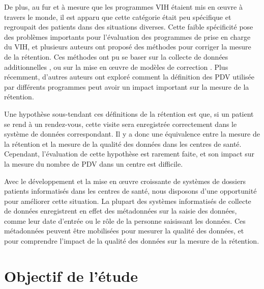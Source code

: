 \documentclass[paper=a4, fontsize=11pt]{scrartcl}
\numberwithin{equation}{section}		%
\numberwithin{figure}{section}			%
\numberwithin{table}{section}				%
\begin{document}
De plus, au fur et à mesure que les programmes VIH étaient mis en \oe uvre à travers le monde, il est apparu que cette catégorie était peu spécifique et regroupait des patients dans des situations diverses\citep{kwong-leung_yu_true_2007,dalal_characteristics_2008,mcguire_vital_2010}. Cette faible spécificité pose des problèmes importants pour l'évaluation des programmes de prise en charge du VIH, et plusieurs auteurs ont proposé des méthodes pour corriger la mesure de la rétention. Ces méthodes ont pu se baser sur la collecte de données additionnelles \citep{yiannoutsos_sampling-based_2008,geng_tracking_2010,tassie_evaluation_2010}, ou sur la mise en \oe uvre de modèles de correction \citep{brinkhof_adjusting_2010,egger_correcting_2011,van_cutsem_correcting_2011,henriques_comparison_2012,verguet_incorporating_2013}. Plus récemment, d'autres auteurs ont exploré comment la définition des PDV utilisée par différents programmes peut avoir un impact important sur la mesure de la rétention\citep{chi_empirical_2010,chi_universal_2011,fox_defining_2012,mugavero_measuring_2012,yehia_comparing_2012,grimsrud_impact_2013,shepherd_impact_2013}.

Une hypothèse sous-tendant ces définitions de la rétention est que, si un patient se rend à un rendez-vous, cette visite sera enregistrée correctement dans le système de données correspondant. Il y a donc une équivalence entre la mesure de la rétention et la mesure de la qualité des données dans les centres de santé. Cependant, l'évaluation de cette hypothèse est rarement faite, et son impact sur la mesure du nombre de PDV dans un centre est difficile.

Avec le développement et la mise en \oe uvre croissante de systèmes de dossiers patients informatisés dans les centres de santé, nous disposons d'une opportunité pour améliorer cette situation. La plupart des systèmes informatisés de collecte de données enregistrent en effet des métadonnées sur la saisie des données, comme leur date d'entrée ou le rôle de la personne saisissant les données. Ces métadonnées peuvent être mobilisées pour mesurer la qualité des données, et pour comprendre l'impact de la qualité des données sur la mesure de la rétention.

\section{Objectif de l'étude}
\end{document}
